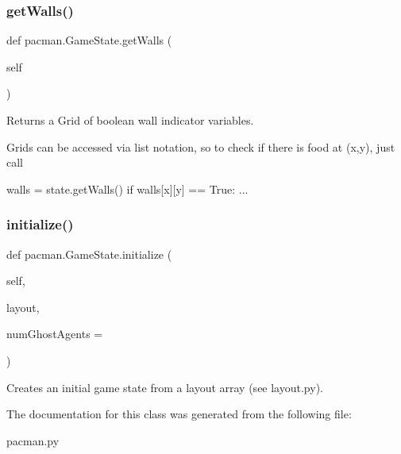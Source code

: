 \subsubsection{\texorpdfstring{get\+Walls()}{getWalls()}}
{\footnotesize\ttfamily def pacman.\+Game\+State.\+get\+Walls (\begin{DoxyParamCaption}\item[{}]{self }\end{DoxyParamCaption})}

\begin{DoxyVerb}Returns a Grid of boolean wall indicator variables.

Grids can be accessed via list notation, so to check
if there is food at (x,y), just call

walls = state.getWalls()
if walls[x][y] == True: ...
\end{DoxyVerb}
 \mbox{\label{classpacman_1_1_game_state_a4c6d262e61c43f550cc509e584c559f1}} 
\subsubsection{\texorpdfstring{initialize()}{initialize()}}
{\footnotesize\ttfamily def pacman.\+Game\+State.\+initialize (\begin{DoxyParamCaption}\item[{}]{self,  }\item[{}]{layout,  }\item[{}]{num\+Ghost\+Agents = {} }\end{DoxyParamCaption})}

\begin{DoxyVerb}Creates an initial game state from a layout array (see layout.py).
\end{DoxyVerb}
 

The documentation for this class was generated from the following file\+:\begin{DoxyCompactItemize}
\item 
pacman.\+py\end{DoxyCompactItemize}
